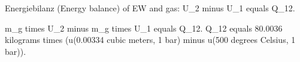 Energiebilanz (Energy balance) of EW and gas:  
U_2 minus U_1 equals Q_12.  

m_g times U_2 minus m_g times U_1 equals Q_12.  
Q_12 equals 80.0036 kilograms times (u(0.00334 cubic meters, 1 bar) minus u(500 degrees Celsius, 1 bar)).